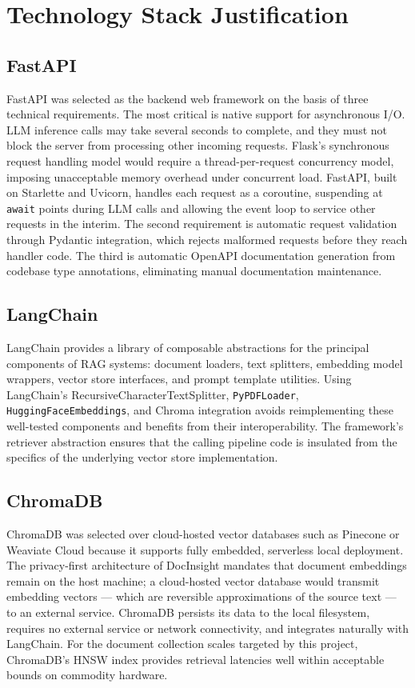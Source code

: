 \section{Technology Stack Justification}

\subsection{FastAPI}

FastAPI was selected as the backend web framework on the basis of three technical requirements. The most critical is native support for asynchronous I/O. LLM inference calls may take several seconds to complete, and they must not block the server from processing other incoming requests. Flask's synchronous request handling model would require a thread-per-request concurrency model, imposing unacceptable memory overhead under concurrent load. FastAPI, built on Starlette and Uvicorn, handles each request as a coroutine, suspending at \texttt{await} points during LLM calls and allowing the event loop to service other requests in the interim. The second requirement is automatic request validation through Pydantic integration, which rejects malformed requests before they reach handler code. The third is automatic OpenAPI documentation generation from codebase type annotations, eliminating manual documentation maintenance.

\subsection{LangChain}

LangChain provides a library of composable abstractions for the principal components of RAG systems: document loaders, text splitters, embedding model wrappers, vector store interfaces, and prompt template utilities. Using LangChain's RecursiveCharacterTextSplitter, \texttt{PyPDFLoader}, \texttt{HuggingFaceEmbeddings}, and Chroma integration avoids reimplementing these well-tested components and benefits from their interoperability. The framework's retriever abstraction ensures that the calling pipeline code is insulated from the specifics of the underlying vector store implementation.

\subsection{ChromaDB}

ChromaDB was selected over cloud-hosted vector databases such as Pinecone or Weaviate Cloud because it supports fully embedded, serverless local deployment. The privacy-first architecture of DocInsight mandates that document embeddings remain on the host machine; a cloud-hosted vector database would transmit embedding vectors --- which are reversible approximations of the source text --- to an external service. ChromaDB persists its data to the local filesystem, requires no external service or network connectivity, and integrates naturally with LangChain. For the document collection scales targeted by this project, ChromaDB's HNSW index provides retrieval latencies well within acceptable bounds on commodity hardware.

